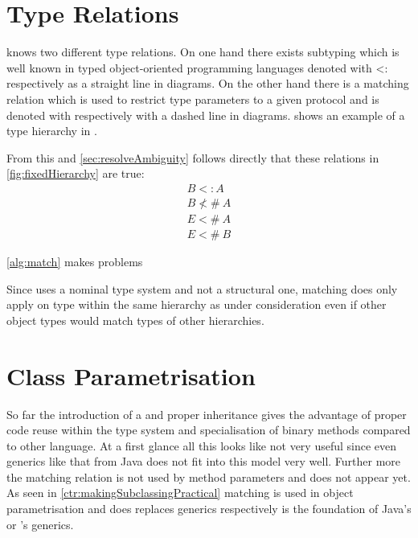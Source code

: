 \section{Type Relations}
\ooplss knows two different type relations. On one hand there exists
subtyping which is well known in typed object-oriented programming
languages denoted with <: respectively as a straight line in diagrams. On
the other hand there is a matching relation which is used to restrict type
parameters to a given protocol and is denoted with \match respectively
with a dashed line in diagrams.  shows an example
of a type hierarchy in \ooplss.

From this and \cref{sec:resolveAmbiguity} follows directly that these
relations in \cref{fig:fixedHierarchy} are true:
\begin{align}
B <: A \\
B \nless\!\!\#~A \label{alg:match} \\
E <\!\!\#~A \\
E <\!\!\#~B
\end{align}

\ref{alg:match} makes problems


Since \ooplss uses a nominal type system and not a structural one,
matching does only apply on type within the same hierarchy as under
consideration even if other object types would match types of other
hierarchies.

\section{Class Parametrisation}
So far the introduction of a \mytype and proper inheritance gives the
advantage of proper code reuse within the type system and specialisation
of binary methods compared to other language. At a first glance all
this looks like not very useful since even generics like that from
Java does not fit into this model very well. Further more the matching
relation is not used by method parameters and does not appear yet. As
seen in \cref{ctr:makingSubclassingPractical} matching is used in object
parametrisation and does replaces generics respectively is the foundation
of Java's or \cs's generics.

